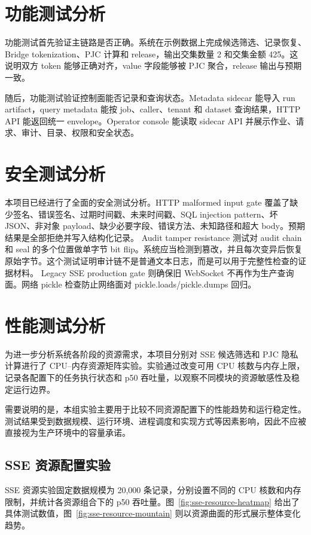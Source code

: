 \documentclass[UTF8,a4paper,12pt,oneside]{ctexrep}
\begin{document}
\section{功能测试分析}

功能测试首先验证主链路是否正确。系统在示例数据上完成候选筛选、记录恢复、Bridge tokenization、PJC 计算和 release，输出交集数量 2 和交集金额 425。这说明双方 token 能够正确对齐，value 字段能够被 PJC 聚合，release 输出与预期一致。

随后，功能测试验证控制面能否记录和查询状态。Metadata sidecar 能导入 run artifact，query metadata 能按 job、caller、tenant 和 dataset 查询结果，HTTP API 能返回统一 envelope。Operator console 能读取 sidecar API 并展示作业、请求、审计、目录、权限和安全状态。

\section{安全测试分析}

本项目已经进行了全面的安全测试分析。HTTP malformed input gate 覆盖了缺少签名、错误签名、过期时间戳、未来时间戳、SQL injection pattern、坏 JSON、非对象 payload、缺少必要字段、错误方法、未知路径和超大 body。预期结果是全部拒绝并写入结构化记录。
Audit tamper resistance 测试对 audit chain 和 seal 的多个位置做单字节 bit flip。系统应当检测到篡改，并且每次变异后恢复原始字节。这个测试证明审计链不是普通文本日志，而是可以用于完整性检查的证据材料。
Legacy SSE production gate 则确保旧 WebSocket 不再作为生产查询面。网络 pickle 检查防止网络面对 pickle.loads/pickle.dumps 回归。


\section{性能测试分析}

为进一步分析系统各阶段的资源需求，本项目分别对 SSE 候选筛选和 PJC 隐私计算进行了 CPU--内存资源矩阵实验。实验通过改变可用 CPU 核数与内存上限，记录各配置下的任务执行状态和 p50 吞吐量，以观察不同模块的资源敏感性及稳定运行边界。

需要说明的是，本组实验主要用于比较不同资源配置下的性能趋势和运行稳定性。测试结果受到数据规模、运行环境、进程调度和实现方式等因素影响，因此不应被直接视为生产环境中的容量承诺。

\subsection{SSE 资源配置实验}

SSE 资源实验固定数据规模为 20,000 条记录，分别设置不同的 CPU 核数和内存限制，并统计各资源组合下的 p50 吞吐量。图~\ref{fig:sse-resource-heatmap} 给出了具体测试数值，图~\ref{fig:sse-resource-mountain} 则以资源曲面的形式展示整体变化趋势。
\end{document}

